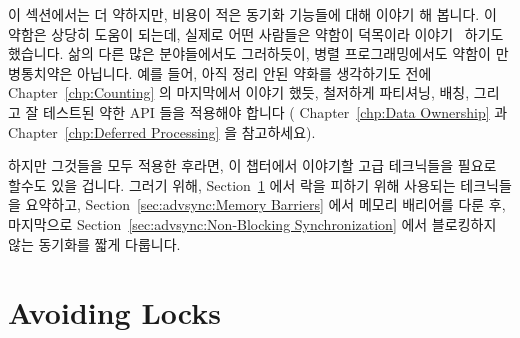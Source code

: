 

이 섹션에서는 더 약하지만, 비용이 적은 동기화 기능들에 대해 이야기 해 봅니다.
이 약함은 상당히 도움이 되는데, 실제로 어떤 사람들은 약함이 덕목이라
이야기~\cite{JadeAlglave2013-WeaknessIsVirtue} 하기도 했습니다.
삶의 다른 많은 분야들에서도 그러하듯이, 병렬 프로그래밍에서도 약함이
만병통치약은 아닙니다.
예를 들어, 아직 정리 안된 약화를 생각하기도 전에 Chapter~\ref{chp:Counting} 의
마지막에서 이야기 했듯, 철저하게 파티셔닝, 배칭, 그리고 잘 테스트된 약한 API
들을 적용해야 합니다 ( Chapter~\ref{chp:Data Ownership} 과
Chapter~\ref{chp:Deferred Processing} 을 참고하세요).

하지만 그것들을 모두 적용한 후라면, 이 챕터에서 이야기할 고급 테크닉들을 필요로
할수도 있을 겁니다.
그러기 위해, Section~\ref{sec:advsync:Avoiding Locks} 에서 락을 피하기 위해
사용되는 테크닉들을 요약하고, Section~\ref{sec:advsync:Memory Barriers} 에서
메모리 배리어를 다룬 후, 마지막으로 Section~\ref{sec:advsync:Non-Blocking
Synchronization} 에서 블로킹하지 않는 동기화를 짧게 다룹니다.
\iffalse

This section discusses a number of ways of using weaker, and hopefully
lower-cost, synchronization primitives.
This weakening can be quite helpful, in fact, some have argued
that weakness is a virtue~\cite{JadeAlglave2013-WeaknessIsVirtue}.
Nevertheless, in parallel programming, as in many other aspects
of life, weakness is not a panacea.
For example, as noted at the end of
Chapter~\ref{chp:Counting},
you should thoroughly apply partitioning, batching, and
well-tested packaged weak APIs (see Chapter~\ref{chp:Data Ownership}
and~\ref{chp:Deferred Processing})
before even thinking about unstructured weakening.

But after doing all that, you still might find yourself needing the
advanced techniques described in this chapter.
To that end,
Section~\ref{sec:advsync:Avoiding Locks}
summarizes techniques used thus far for avoiding locks,
Section~\ref{sec:advsync:Memory Barriers}
covers use of memory barriers, and finally
Section~\ref{sec:advsync:Non-Blocking Synchronization}
gives a brief overview of non-blocking synchronization.
\fi

\section{Avoiding Locks}
\label{sec:advsync:Avoiding Locks}

